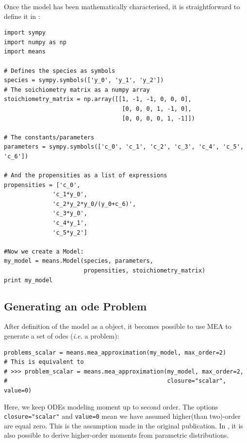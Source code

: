 Once the model has been mathematically characterised, it is straightforward to define it in \means:


\begin{framed}
\begin{verbatim}
import sympy
import numpy as np
import means

# Defines the species as symbols
species = sympy.symbols(['y_0', 'y_1', 'y_2'])
# The soichiometry matrix as a numpy array
stoichiometry_matrix = np.array([[1, -1, -1, 0, 0, 0],
                                  [0, 0, 0, 1, -1, 0],
                                  [0, 0, 0, 0, 1, -1]])

# The constants/parameters
parameters = sympy.symbols(['c_0', 'c_1', 'c_2', 'c_3', 'c_4', 'c_5', 'c_6'])

# And the propensities as a list of expressions
propensities = ['c_0',
              'c_1*y_0',
              'c_2*y_2*y_0/(y_0+c_6)',
              'c_3*y_0',
              'c_4*y_1',
              'c_5*y_2']

#Now we create a Model:
my_model = means.Model(species, parameters,
                       propensities, stoichiometry_matrix)
print my_model
\end{verbatim}
\end{framed}

\subsection{Generating an \gls{ode} Problem}
After definition of the model as a \py{} object, it becomes possible to use MEA to generate a set of \gls{ode}s (\emph{i.e.} a problem):


\begin{framed}
\begin{verbatim}
problems_scalar = means.mea_approximation(my_model, max_order=2)
# This is equivalent to
# >>> problem_scalar = means.mea_approximation(my_model, max_order=2,
#                                              closure="scalar", value=0)
\end{verbatim}
\end{framed}
Here, we keep ODEs modeling moment up to second order. The options \texttt{closure="scalar"} and \texttt{value=0} mean we have assumed higher(than two)-order are equal zero.
This is the assumption made in the original publication\cite{ale_general_2013}. In \means, it is also possible to derive higher-order moments from parametric distributions.

